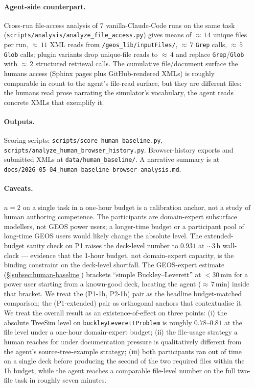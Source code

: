 \documentclass{article}
\begin{document}
\paragraph{Agent-side counterpart.} Cross-run file-access analysis of $7$ vanilla-Claude-Code runs on the same task (\texttt{scripts/analysis/analyze\_file\_access.py}) gives means of ${\approx}\,14$ unique files per run, ${\approx}\,11$ XML reads from \texttt{/geos\_lib/inputFiles/}, ${\approx}\,7$ \texttt{Grep} calls, ${\approx}\,5$ \texttt{Glob} calls; plugin variants drop unique-file reads to ${\approx}\,4$ and replace \texttt{Grep}/\texttt{Glob} with ${\approx}\,2$ structured retrieval calls. The cumulative file/document surface the humans access (Sphinx pages plus GitHub-rendered XMLs) is roughly comparable in count to the agent's file-read surface, but they are different files: the humans read prose narrating the simulator's vocabulary, the agent reads concrete XMLs that exemplify it.

\paragraph{Outputs.} Scoring scripts: \texttt{scripts/score\_human\_baseline.py}, \texttt{scripts/analyze\_human\_browser\_history.py}. Browser-history exports and submitted XMLs at \texttt{data/human\_baseline/}. A narrative summary is at \texttt{docs/2026-05-04\_human-baseline-browser-analysis.md}.

\paragraph{Caveats.} $n=2$ on a single task in a one-hour budget is a calibration anchor, not a study of human authoring competence. The participants are domain-expert subsurface modellers, not GEOS power users; a longer-time budget or a participant pool of long-time GEOS users would likely change the absolute level. The extended-budget sanity check on P1 raises the deck-level number to $0.931$ at $\sim\!3\,$h wall-clock --- evidence that the 1-hour budget, not domain-expert capacity, is the binding constraint on the deck-level shortfall. The GEOS-expert estimate (\S\ref{subsec:human-baseline}) brackets ``simple Buckley--Leverett'' at ${<}30\,$min for a power user starting from a known-good deck, locating the agent (${\approx}\,7\,$min) inside that bracket. We treat the (P1-1h, P2-1h) pair as the headline budget-matched comparison; the (P1-extended) pair as orthogonal anchors that contextualise it. We treat the overall result as an existence-of-effect on three points: (i) the absolute TreeSim level on \texttt{buckleyLeverettProblem} is roughly $0.78$--$0.81$ at the file level under a one-hour domain-expert budget; (ii) the file-usage strategy a human reaches for under documentation pressure is qualitatively different from the agent's source-tree-example strategy; (iii) both participants ran out of time on a single deck before producing the second of the two required files within the 1h budget, while the agent reaches a comparable file-level number on the full two-file task in roughly seven minutes.
\end{document}
